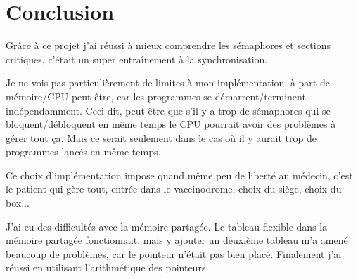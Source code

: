 \documentclass[a4paper]{article}
\begin{document}
  \section{Conclusion}

  Grâce à ce projet j'ai réussi à mieux comprendre les sémaphores et sections critiques, c'était un super  entraînement à la synchronisation.\par
  Je ne vois pas particulièrement de limites à mon implémentation, à part de mémoire/CPU peut-être, car les programmes se démarrent/terminent indépendamment. Ceci dit, peut-être que s'il y a trop de sémaphores qui se bloquent/débloquent en même temps le CPU pourrait avoir des problèmes à gérer tout ça. Mais ce serait seulement dans le cas où il y aurait trop de programmes lancés en même temps.\par
  Ce choix d'implémentation impose quand même peu de liberté au médecin, c'est le patient qui gère tout, entrée dans le vaccinodrome, choix du siège, choix du box...\par
  J'ai eu des difficultés avec la mémoire partagée. Le tableau flexible dans la mémoire partagée fonctionnait, mais y ajouter un deuxième tableau m'a amené beaucoup de problèmes, car le pointeur n'était pas bien placé. Finalement j'ai réussi en utilisant l'arithmétique des pointeurs.
\end{document}
